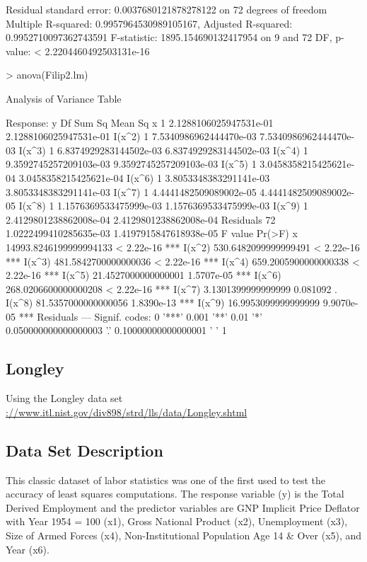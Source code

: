 \documentclass[10pt]{article}
\begin{document}
\begin{Schunk}
\begin{Soutput}
Residual standard error: 0.0037680121878278122 on 72 degrees of freedom
Multiple R-squared:  0.9957964530989105167,	Adjusted R-squared:  0.9952710097362743591 
F-statistic: 1895.154690132417954 on 9 and 72 DF,  p-value: < 2.2204460492503131e-16
\end{Soutput}
\begin{Sinput}
> anova(Filip2.lm)
\end{Sinput}
\begin{Soutput}
Analysis of Variance Table

Response: y
          Df                 Sum Sq                Mean Sq
x          1 2.1288106025947531e-01 2.1288106025947531e-01
I(x^2)     1 7.5340986962444470e-03 7.5340986962444470e-03
I(x^3)     1 6.8374929283144502e-03 6.8374929283144502e-03
I(x^4)     1 9.3592745257209103e-03 9.3592745257209103e-03
I(x^5)     1 3.0458358215425621e-04 3.0458358215425621e-04
I(x^6)     1 3.8053348383291141e-03 3.8053348383291141e-03
I(x^7)     1 4.4441482509089002e-05 4.4441482509089002e-05
I(x^8)     1 1.1576369533475999e-03 1.1576369533475999e-03
I(x^9)     1 2.4129801238862008e-04 2.4129801238862008e-04
Residuals 72 1.0222499410285635e-03 1.4197915847618938e-05
                         F value     Pr(>F)    
x         14993.8246199999994133 < 2.22e-16 ***
I(x^2)      530.6482099999999491 < 2.22e-16 ***
I(x^3)      481.5842700000000036 < 2.22e-16 ***
I(x^4)      659.2005900000000338 < 2.22e-16 ***
I(x^5)       21.4527000000000001 1.5707e-05 ***
I(x^6)      268.0206600000000208 < 2.22e-16 ***
I(x^7)        3.1301399999999999   0.081092 .  
I(x^8)       81.5357000000000056 1.8390e-13 ***
I(x^9)       16.9953099999999999 9.9070e-05 ***
Residuals                                      
---
Signif. codes:  
0 '***' 0.001 '**' 0.01 '*' 0.050000000000000003 '.' 0.10000000000000001 ' ' 1
\end{Soutput}
\end{Schunk}



\subsection{Longley}
Using the Longley data set \url{://www.itl.nist.gov/div898/strd/lls/data/Longley.shtml}

\subsection*{Data Set Description}
This classic dataset of labor statistics was one of the first used to test the 
accuracy of least squares computations. The response variable (y) is the 
Total Derived Employment and the predictor variables are GNP Implicit Price Deflator 
with Year 1954 = 100 (x1), Gross National Product (x2), Unemployment (x3), 
Size of Armed Forces (x4), Non-Institutional Population Age 14 \& Over (x5), 
and Year (x6).
\end{document}
